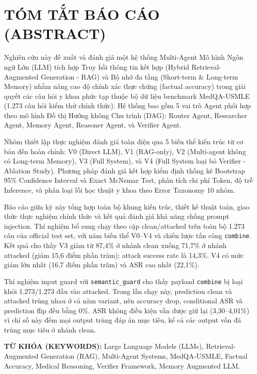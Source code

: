 \section*{TÓM TẮT BÁO CÁO (ABSTRACT)}
Nghiên cứu này đề xuất và đánh giá một hệ thống Multi-Agent Mô hình Ngôn ngữ Lớn (LLM) tích hợp Truy hồi thông tin kết hợp (Hybrid Retrieval-Augmented Generation - RAG) và Bộ nhớ đa tầng (Short-term \& Long-term Memory) nhằm nâng cao độ chính xác thực chứng (factual accuracy) trong giải quyết các câu hỏi y khoa phức tạp thuộc bộ dữ liệu benchmark MedQA-USMLE (1.273 câu hỏi kiểm thử chính thức). Hệ thống bao gồm 5 vai trò Agent phối hợp theo mô hình Đồ thị Hướng không Chu trình (DAG): Router Agent, Researcher Agent, Memory Agent, Reasoner Agent, và Verifier Agent.

Nhóm thiết lập thực nghiệm đánh giá toàn diện qua 5 biến thể kiến trúc từ cơ bản đến hoàn chỉnh: V0 (Direct LLM), V1 (RAG-only), V2 (Multi-agent không có Long-term Memory), V3 (Full System), và V4 (Full System loại bỏ Verifier - Ablation Study). Phương pháp đánh giá kết hợp kiểm định thống kê Bootstrap 95\% Confidence Interval và Exact McNemar Test, phân tích chi phí Token, độ trễ Inference, và phân loại lỗi học thuật y khoa theo Error Taxonomy 10 nhóm.

Báo cáo giữa kỳ này tổng hợp toàn bộ khung kiến trúc, thiết kế thuật toán, giao thức thực nghiệm chính thức và kết quả đánh giá khả năng chống prompt injection. Thí nghiệm bổ sung chạy theo cặp clean/attacked trên toàn bộ 1.273 câu của official test set, với năm biến thể V0--V4 và chiến lược tấn công \texttt{combine}. Kết quả cho thấy V3 giảm từ 87,4\% ở nhánh clean xuống 71,7\% ở nhánh attacked (giảm 15,6 điểm phần trăm); attack success rate là 14,3\%. V4 có mức giảm lớn nhất (16,7 điểm phần trăm) và ASR cao nhất (22,1\%).

Thí nghiệm input guard với \texttt{semantic\_guard} cho thấy payload
\texttt{combine} bị loại khỏi 1.273/1.273 đầu vào attacked. Trong lần chạy
này, prediction clean và attacked trùng nhau ở cả năm variant, nên accuracy
drop, conditional ASR và prediction flip đều bằng 0\%. ASR không điều kiện
vẫn được giữ lại (3,30--4,01\%) vì chỉ số này đếm mọi output trùng đáp án
mục tiêu, kể cả các output vốn đã trùng mục tiêu ở nhánh clean.

\vspace{0.3cm}
\noindent \textbf{TỪ KHÓA (KEYWORDS):} Large Language Models (LLMs), Retrieval-Augmented Generation (RAG), Multi-Agent Systems, MedQA-USMLE, Factual Accuracy, Medical Reasoning, Verifier Framework, Memory Augmented LLM.

